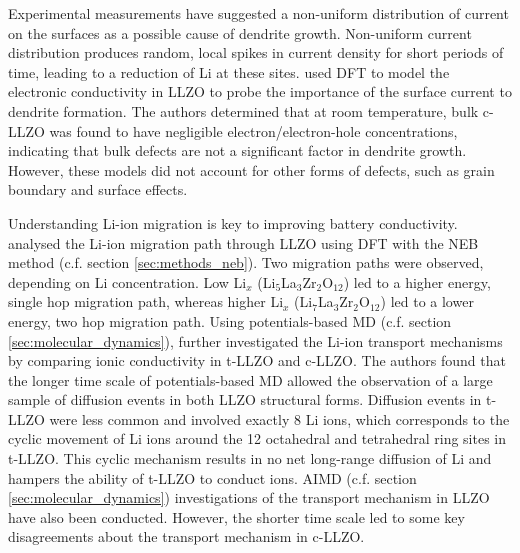 \documentclass[../main.tex]{subfiles}
\begin{document}
Experimental measurements have suggested a non-uniform distribution of current on the surfaces as a possible cause of dendrite growth.\cite{Han2019_dendrite, Aguesse2017} Non-uniform current distribution produces random, local spikes in current density for short periods of time, leading to a reduction of Li at these sites. \citeauthor{squires_2020} used DFT to model the electronic conductivity in LLZO to probe the importance of the surface current to dendrite formation.\cite{squires_2020} The authors determined that at room temperature, bulk c-LLZO was found to have negligible electron/electron-hole concentrations, indicating that bulk defects are not a significant factor in dendrite growth. However, these models did not account for other forms of defects, such as grain boundary and surface effects.

Understanding Li-ion migration is key to improving battery conductivity. \citeauthor{Xu2012} analysed the Li-ion migration path through LLZO using DFT with the NEB method (c.f. section \ref{sec:methods_neb}).\cite{Xu2012} Two migration paths were observed, depending on Li concentration. Low Li$_x$ (Li$_5$La$_3$Zr$_2$O$_{12}$) led to a higher energy, single hop migration path, whereas higher Li$_x$ (Li$_7$La$_3$Zr$_2$O$_{12}$) led to a lower energy, two hop migration path. Using potentials-based MD (c.f. section \ref{sec:molecular_dynamics}), \citeauthor{Burbano2016} further investigated the Li-ion transport mechanisms by comparing ionic conductivity in t-LLZO and c-LLZO.\cite{Burbano2016} The authors found that the longer time scale of potentials-based MD allowed the observation of a large sample of diffusion events in both LLZO structural forms. Diffusion events in t-LLZO were less common and involved exactly 8 Li ions, which corresponds to the cyclic movement of Li ions around the 12 octahedral and tetrahedral ring sites in t-LLZO. This cyclic mechanism results in no net long-range diffusion of Li and hampers the ability of t-LLZO to conduct ions. AIMD (c.f. section \ref{sec:molecular_dynamics}) investigations of the transport mechanism in LLZO have also been conducted. However, the shorter time scale led to some key disagreements about the transport mechanism in c-LLZO.\cite{Meier2014,Jalem2013,Burbano2016} 
\end{document}

